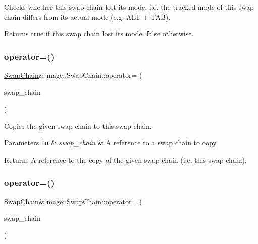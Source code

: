 Checks whether this swap chain lost its mode, i.\+e. the tracked mode of this swap chain differs from its actual mode (e.\+g. A\+LT + T\+AB).

\begin{DoxyReturn}{Returns}
{\ttfamily true} if this swap chain lost its mode. {\ttfamily false} otherwise. 
\end{DoxyReturn}
\hypertarget{classmage_1_1_swap_chain_a8ea6de219f37d447487d7d3b4bbd5867}{}\label{classmage_1_1_swap_chain_a8ea6de219f37d447487d7d3b4bbd5867} 
\subsubsection{\texorpdfstring{operator=()}{operator=()}\hspace{0.1cm}{\footnotesize\ttfamily [1/2]}}
{\footnotesize\ttfamily \hyperlink{classmage_1_1_swap_chain}{Swap\+Chain}\& mage\+::\+Swap\+Chain\+::operator= (\begin{DoxyParamCaption}\item[{const \hyperlink{classmage_1_1_swap_chain}{Swap\+Chain} \&}]{swap\+\_\+chain }\end{DoxyParamCaption})\hspace{0.3cm}{\ttfamily [delete]}}

Copies the given swap chain to this swap chain.


\begin{DoxyParams}[1]{Parameters}
\mbox{\tt in}  & {\em swap\+\_\+chain} & A reference to a swap chain to copy. \\
\hline
\end{DoxyParams}
\begin{DoxyReturn}{Returns}
A reference to the copy of the given swap chain (i.\+e. this swap chain). 
\end{DoxyReturn}
\hypertarget{classmage_1_1_swap_chain_a4335d4e0869c43a66bfce5f2d0d6f34c}{}\label{classmage_1_1_swap_chain_a4335d4e0869c43a66bfce5f2d0d6f34c} 
\subsubsection{\texorpdfstring{operator=()}{operator=()}\hspace{0.1cm}{\footnotesize\ttfamily [2/2]}}
{\footnotesize\ttfamily \hyperlink{classmage_1_1_swap_chain}{Swap\+Chain}\& mage\+::\+Swap\+Chain\+::operator= (\begin{DoxyParamCaption}\item[{\hyperlink{classmage_1_1_swap_chain}{Swap\+Chain} \&\&}]{swap\+\_\+chain }\end{DoxyParamCaption})\hspace{0.3cm}{\ttfamily [delete]}}

